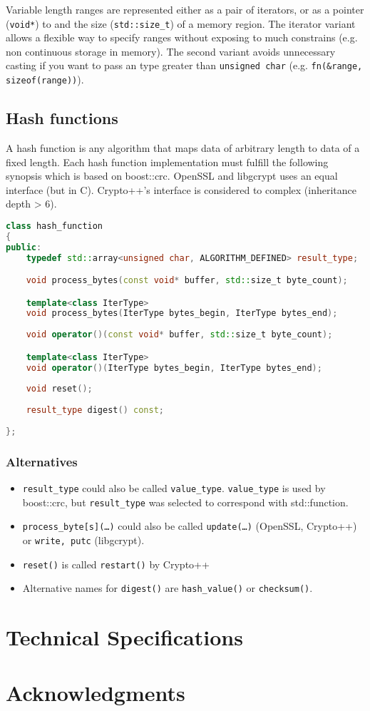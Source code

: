 \documentclass[10pt,letterpaper]{article}
\begin{document}
Variable length ranges are represented either as a pair of iterators, or as a pointer (\texttt{void*}) to and the size (\texttt{std::size\_t}) of a memory region. The iterator variant allows a flexible way to specify ranges without exposing to much constrains (e.g. non continuous storage in memory). The second variant avoids unnecessary casting if you want to pass an type greater than \texttt{unsigned char} (e.g. \texttt{fn(\&range, sizeof(range))}).

\subsection{Hash functions}
A hash function is any algorithm that maps data of arbitrary length to data of a fixed length. %
Each hash function implementation must fulfill the following synopsis which is based on boost::crc. OpenSSL and libgcrypt uses an equal interface (but in C). Crypto++'s interface is considered to complex (inheritance depth > 6).
\begin{lstlisting}[language=C++]
class hash_function
{
public:
	typedef std::array<unsigned char, ALGORITHM_DEFINED> result_type;

	void process_bytes(const void* buffer, std::size_t byte_count);

	template<class IterType>
	void process_bytes(IterType bytes_begin, IterType bytes_end);
	
	void operator()(const void* buffer, std::size_t byte_count);

	template<class IterType>
	void operator()(IterType bytes_begin, IterType bytes_end);
	
	void reset();
	
	result_type digest() const;
	
};
\end{lstlisting}
\subsubsection*{Alternatives}
\begin{itemize}
\item \texttt{result\_type} could also be called \texttt{value\_type}. \texttt{value\_type} is used by boost::crc, but \texttt{result\_type} was selected to correspond with std::function.

\item \texttt{process\_byte[s](\dots)} could also be called \texttt{update(\dots)} (OpenSSL, Crypto++) or \texttt{write, putc} (libgcrypt).

\item \texttt{reset()} is called \texttt{restart()} by Crypto++

\item Alternative names for \texttt{digest()} are \texttt{hash\_value()} or \texttt{checksum()}.
\end{itemize}

\section{Technical Specifications}

\section{Acknowledgments}
\end{document}
